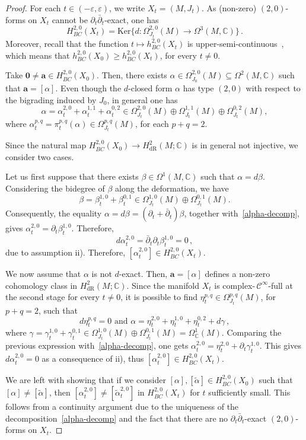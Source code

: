 \documentclass[a4paper]{amsart}
\theoremstyle{definition}
\theoremstyle{remark}
\newcommand{\bC}{{\mathbb C}}
\numberwithin{equation}{section}
\begin{document}
\begin{proof}
For each $t\in(-\varepsilon,\varepsilon)$, we write $X_t=(M,J_t)$. As (non-zero) $(2,0)$-forms on $X_t$ cannot be $\partial_t\bar{\partial}_t$-exact, one has
\[
H_{BC}^{2,0}(X_t)=\text{Ker}\big\{ d\colon\Omega^{2,0}_{J_t}(M)\to \Omega^3(M,\bC)\big\}\,.
\]
Moreover, recall that the function $t\mapsto h_{BC}^{2,0}(X_t)$ is upper-semi-continuous~\cite[Lemma 3.2]{Schweitzer}, which means that $h_{BC}^{2,0}(X_0)\geq h_{BC}^{2,0}(X_t)$, for every $t\neq 0$. 

Take $\mathbf 0\neq \mathbf a\in H_{BC}^{2,0}(X_0)$. Then, there exists $\alpha\in\Omega^{2,0}_{J_0}(M)\subseteq\Omega^2(M,\bC)$ such that $\mathbf a=[\alpha]$. Even though the $d$-closed form $\alpha$ has type $(2,0)$ with respect to the bigrading induced by $J_0$, in general one has
\begin{equation}\label{alpha-decomp}
\alpha=\alpha^{2,0}_t+\alpha^{1,1}_t+\alpha^{0,2}_t
	\in\Omega^{2,0}_{J_t}(M)\oplus\Omega^{1,1}_{J_t}(M)\oplus\Omega^{0,2}_{J_t}(M),
\end{equation}
where $\alpha^{p,q}_t=\pi_t^{p,q}(\alpha)\in\Omega^{p,q}_{J_t}(M)$, for each $p+q=2$. 

Since the natural map $H_{BC}^{2,0}(X_0)\to H^2_{\text{dR}}(M;\mathbb C)$ is in general not injective, we consider two cases.

Let us first suppose that there exists $\beta\in\Omega^1(M,\bC)$ such that $\alpha=d\beta$. Considering the bidegree of $\beta$ along the deformation, we have
$$\beta=\beta^{1,0}_t+\beta^{0,1}_t\in\Omega^{1,0}_{J_t}(M)\oplus\Omega^{0,1}_{J_t}(M).$$
Consequently, the equality $\alpha=d\beta=(\partial_t+\bar{\partial}_t)\beta$, together with~\eqref{alpha-decomp}, gives $\alpha^{2,0}_t=\partial_t\beta^{1,0}_t$. Therefore, 
\[
d\alpha^{2,0}_t=\bar{\partial}_t\partial_t\beta^{1,0}_t=0\,,
\]
due to assumption ii). Therefore, $[\alpha^{2,0}_t]\in H_{BC}^{2,0}(X_t)$.

We now assume that $\alpha$ is not $d$-exact. Then, $\mathbf a=[\alpha]$ defines a non-zero cohomology class in $H_{\text{dR}}^2(M;\mathbb C)$. Since the manifold $X_t$ is complex-\,$\mathcal C^\infty$-full at the second stage for every $t\neq 0$, it is possible to find $\eta^{p,q}_t\in\Omega^{p,q}_{J_t}(M)$, for $p+q=2$, such that 
\[
d\eta^{p,q}_t=0 \text{ \ and \ } \alpha=\eta^{2,0}_t+\eta^{1,0}_t+\eta^{0,2}_t+d\gamma\,,
\]
where $\gamma=\gamma^{1,0}_t+\gamma^{0,1}_t\in\Omega^{1,0}_{J_t}(M)\oplus\Omega^{0,1}_{J_t}(M)=\Omega^1_{\mathbb C}(M)$. Comparing the previous expression with~\eqref{alpha-decomp}, one gets
$\alpha^{2,0}_t=\eta^{2,0}_t+\partial_t\gamma^{1,0}_t$. This gives $d\alpha^{2,0}_t=0$ as a consequence of ii), thus $[\alpha^{2,0}_t]\in H_{BC}^{2,0}(X_t)$.

We are left with showing that if we consider $[\alpha], [\tilde{\alpha}]\in H^{2,0}_{BC}(X_0)$ such that $[\alpha] \neq [\tilde{\alpha}]$, then $[\alpha^{2,0}_t]\neq [\tilde{\alpha}^{2,0}_t]$ in $H_{BC}^{2,0}(X_t)$ for $t$ sufficiently small. This follows from a continuity argument due to the uniqueness of the decomposition~\eqref{alpha-decomp} and the fact that there are no $\partial_t\bar{\partial}_t$-exact $(2,0)$-forms on $X_t$.

\end{proof}
\end{document}
